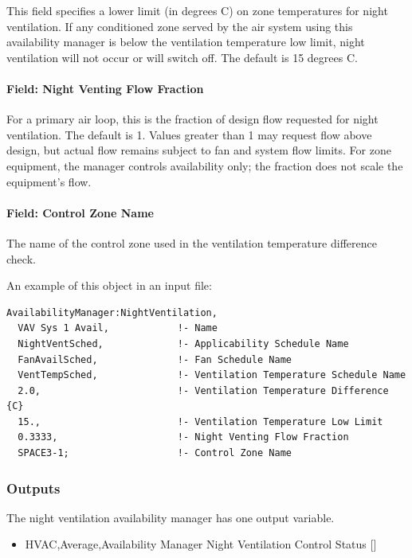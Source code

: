 This field specifies a lower limit (in degrees C) on zone temperatures for night ventilation. If any conditioned zone served by the air system using this availability manager is below the ventilation temperature low limit, night ventilation will not occur or will switch off. The default is 15 degrees C.

\paragraph{Field: Night Venting Flow Fraction}\label{field-night-venting-flow-fraction}

For a primary air loop, this is the fraction of design flow requested for night ventilation. The default is 1. Values greater than 1 may request flow above design, but actual flow remains subject to fan and system flow limits. For zone equipment, the manager controls availability only; the fraction does not scale the equipment's flow.

\paragraph{Field: Control Zone Name}\label{field-control-zone-name-000}

The name of the control zone used in the ventilation temperature difference check.

An example of this object in an input file:

\begin{lstlisting}
AvailabilityManager:NightVentilation,
  VAV Sys 1 Avail,            !- Name
  NightVentSched,             !- Applicability Schedule Name
  FanAvailSched,              !- Fan Schedule Name
  VentTempSched,              !- Ventilation Temperature Schedule Name
  2.0,                        !- Ventilation Temperature Difference   {C}
  15.,                        !- Ventilation Temperature Low Limit
  0.3333,                     !- Night Venting Flow Fraction
  SPACE3-1;                   !- Control Zone Name
\end{lstlisting}

\subsubsection{Outputs}\label{outputs-8-008}

The night ventilation availability manager has one output variable.

\begin{itemize}
\tightlist
\item
  HVAC,Average,Availability Manager Night Ventilation Control Status {[]}
\end{itemize}

